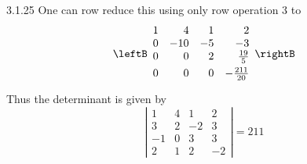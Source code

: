 \begin{Answer}{3.1.25}
One can row reduce this using only row operation 3 to$\allowbreak $%
\[
\leftB
\begin{array}{rrrr}
1 & 4 & 1 & 2 \\
0 & -10 & -5 & -3 \\
0 & 0 & 2 & \vspace{0.05in}\frac{19}{5} \\
0 & 0 & 0 & -\vspace{0.05in}\frac{211}{20}
\end{array}
\rightB
\]
Thus the determinant is given by
\[
\left|
\begin{array}{rrrr}
1 & 4 & 1 & 2 \\
3 & 2 & -2 & 3 \\
-1 & 0 & 3 & 3 \\
2 & 1 & 2 & -2
\end{array}
\right| = 211
\]
\end{Answer}
